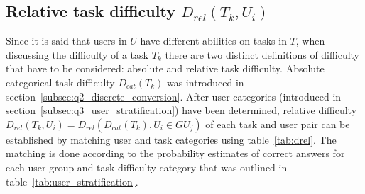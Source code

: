 \subsection{Relative task difficulty $D_{rel}(T_k, U_i)$} \label{subsec:q3_drel}

Since it is said that users in $U$ have different abilities on tasks in $T$, when discussing the difficulty of a task $T_k$ there are two distinct definitions of difficulty that have to be considered: absolute and relative task difficulty.
Absolute categorical task difficulty $D_{cat}(T_k)$ was introduced in section~\ref{subsec:q2_discrete_conversion}.
After user categories (introduced in section~\ref{subsec:q3_user_stratification}) have been determined, relative difficulty $D_{rel}(T_k, U_i) = D_{rel}(D_{cat}(T_k), U_i \in GU_j)$ of each task and user pair can be established by matching user and task categories using table~\ref{tab:drel}.
The matching is done according to the probability estimates of correct answers for each user group and task difficulty category that was outlined in table~\ref{tab:user_stratification}.

